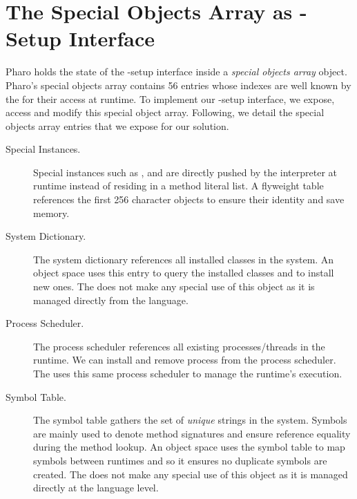 \section{The Special Objects Array as \VM-Setup Interface}\label{sec:setup_interface}

Pharo \VM holds the state of the \VM-setup interface inside a \emph{special objects array} object. Pharo's special objects array contains 56 entries whose indexes are well known by the \VM for their access at runtime. To implement our \VM-setup interface, we expose, access and modify this special object array. Following, we detail the special objects array entries that we expose for our solution.

\begin{description}
\item[Special Instances.] Special instances such as ,  and  are directly pushed by the \VM interpreter at runtime instead of residing in a method literal list. A flyweight  table references the first 256 character objects to ensure their identity and save memory.

\item[System Dictionary.] The system dictionary references all installed classes in the system. An object space uses this entry to query the installed classes and to install new ones. The \VM does not make any special use of this object as it is managed directly from the language.

\item[Process Scheduler.] The process scheduler references all existing processes/threads in the runtime. We can install and remove process from the process scheduler. The \VM uses this same process scheduler to manage the runtime's execution.

\item[Symbol Table.] The symbol table gathers the set of \emph{unique} strings in the system. Symbols are mainly used to denote method signatures and ensure reference equality during the method lookup. An object space uses the symbol table to map symbols between runtimes and so it ensures no duplicate symbols are created. The \VM does not make any special use of this object as it is managed directly at the language level.


\end{description}
